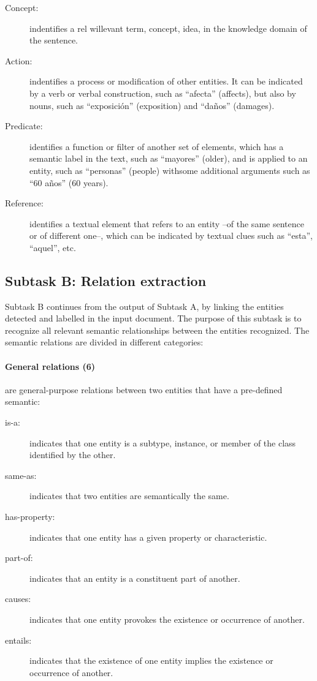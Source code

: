 \documentclass[a4paper,11pt,twocolumn,twoside]{article}
\begin{document}
\begin{description}
  \item[Concept:] indentifies a rel willevant term, concept, idea, in the knowledge domain of the sentence.
  \item[Action:] indentifies a process or modification of other entities. It can be indicated by a verb or verbal construction, such as “afecta” (affects), but also by nouns, such as “exposición” (exposition) and “daños” (damages).
  \item[Predicate:] identifies a function or filter of another set of elements, which has a semantic label in the text, such as “mayores” (older), and is applied to an entity, such as “personas” (people) withsome additional arguments such as “60 años” (60 years).
  \item[Reference:] identifies a textual element that refers to an entity --of the same sentence or of different one--, which can be indicated by textual clues such as “esta”, “aquel”, etc.
\end{description}

\subsection{Subtask B: Relation extraction}

Subtask B continues from the output of Subtask A, by linking the entities detected and labelled in the input document. The purpose of this subtask is to recognize all relevant semantic relationships between the entities recognized. The semantic relations are divided in different categories:

\paragraph{General relations (6)} are general-purpose relations between two entities that have a pre-defined semantic:

\begin{description}
  \item[is-a:] indicates that one entity is a subtype, instance, or member of the class identified by the other.
  \item[same-as:] indicates that two entities are semantically the same.
  \item[has-property:] indicates that one entity has a given property or characteristic.
  \item[part-of:] indicates that an entity is a constituent part of another.
  \item[causes:] indicates that one entity provokes the existence or occurrence of another.
  \item[entails:] indicates that the existence of one entity implies the existence or occurrence of another.
\end{description}
\end{document}
